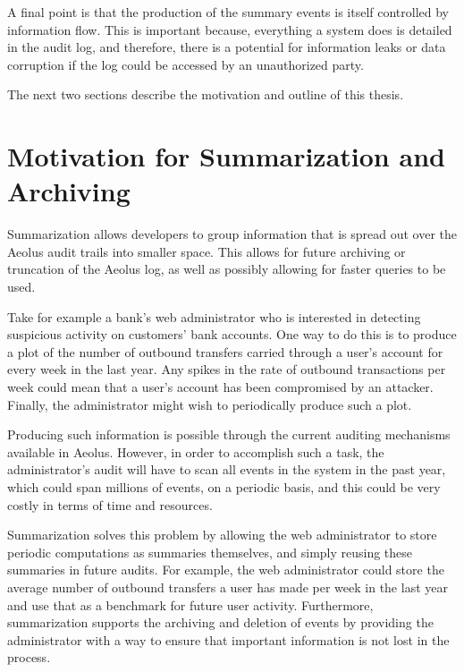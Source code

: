 A final point is that the production of the summary events is itself controlled by information flow.  This is important because, everything a system does is detailed in the audit log, and therefore, there is a potential for information leaks or data corruption if the log could be accessed by an unauthorized party.

The next two sections describe the motivation and outline of this thesis.

\section{Motivation for Summarization and Archiving}

Summarization allows developers to group information that is spread out over the Aeolus audit trails into smaller space. This allows for future archiving or truncation of the Aeolus log, as well as possibly allowing for faster queries to be used.

Take for example a bank's web administrator who is interested in detecting suspicious activity on customers' bank accounts. One way to do this is to produce a plot of the number of outbound transfers carried through a user's account for every week in the last year. Any spikes in the rate of outbound transactions per week could mean that a user's account has been compromised by an attacker. Finally, the administrator might wish to periodically produce such a plot.

Producing such information is possible through the current auditing mechanisms available in Aeolus. However, in order to accomplish such a task, the administrator's audit will have to scan all events in the system in the past year, which could span millions of events, on a periodic basis, and this could be very costly in terms of time and resources.

Summarization solves this problem by allowing the web administrator to store periodic computations as summaries themselves, and simply reusing these summaries in future audits. For example, the web administrator could store the average number of outbound transfers a user has made per week in the last year and use that as a benchmark for future user activity. Furthermore, summarization supports the archiving and deletion of events by providing the administrator with a way to ensure that important information is not lost in the process.

